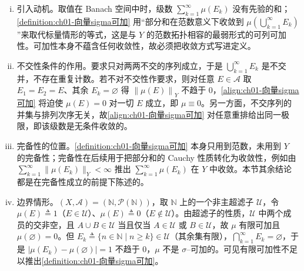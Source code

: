 \documentclass[../../main.tex]{subfiles}%
\begin{document}
\begin{remark}\label{remark:ch01-向量sigma可加动机}
\begin{enumerate}[(i)]
\item 引入动机。取值在 Banach 空间中时，级数 $\sum_{k=1}^\infty\mu(E_k)$ 没有先验的和；\cref{definition:ch01-向量sigma可加} 用“部分和在范数意义下收敛到 $\mu\left(\bigcup_{k=1}^\infty E_k\right)$”来取代标量情形的等式，这是与 $Y$ 的范数拓扑相容的最弱形式的可列可加性。可加性本身不蕴含任何收敛性，故必须把收敛方式写进定义。
\item 不交性条件的作用。要求只对两两不交的序列成立，于是 $\bigcup_{k=1}^\infty E_k$ 是不交并，不存在重复计数。若不对不交性作要求，则对任意 $E\in\mathcal{A}$ 取 $E_1=E_2=E$、其余 $E_k=\varnothing$ 得 $\left\|\mu(E)\right\|_Y$ 不趋于 $0$，\eqref{align:ch01-向量sigma可加} 将迫使 $\mu(E)=0$ 对一切 $E$ 成立，即 $\mu\equiv0$。另一方面，不交序列的并集与排列次序无关，故\eqref{align:ch01-向量sigma可加} 对任意重排给出同一极限，即该级数是无条件收敛的。
\item 完备性的位置。\cref{definition:ch01-向量sigma可加} 本身只用到范数，未用到 $Y$ 的完备性；完备性在后续用于把部分和的 Cauchy 性质转化为收敛性，例如由 $\sum_{k=1}^\infty\|\mu(E_k)\|_Y<\infty$ 推出 $\sum_{k=1}^\infty\mu(E_k)$ 在 $Y$ 中收敛。本节其余结论都是在完备性成立的前提下陈述的。
\item 边界情形。$(X,\mathcal{A})=(\mathbb{N},\mathcal{P}(\mathbb{N}))$，取 $\mathbb{N}$ 上的一个非主超滤子 $\mathcal{U}$，令 $\mu(E)\triangleq1$（$E\in\mathcal{U}$）、$\mu(E)\triangleq0$（$E\notin\mathcal{U}$）。由超滤子的性质，$\mathcal{U}$ 中两个成员的交非空，且 $A\cup B\in\mathcal{U}$ 当且仅当 $A\in\mathcal{U}$ 或 $B\in\mathcal{U}$，故 $\mu$ 有限可加且 $\mu(\varnothing)=0$。但 $E_k\triangleq\{n\in\mathbb{N}\mid n\geqslant k\}\in\mathcal{U}$（其余集有限），$\bigcap_{k=1}^\infty E_k=\varnothing$，于是 $\left|\mu(E_k)-\mu(\varnothing)\right|=1$ 不趋于 $0$，$\mu$ 不是 $\sigma$--可加的。可见有限可加性不足以推出\cref{definition:ch01-向量sigma可加}。
\end{enumerate}
\end{remark}
\end{document}
